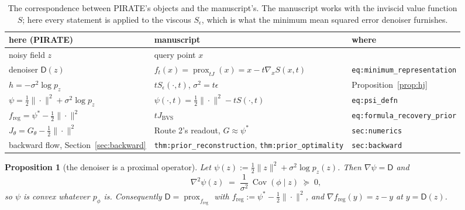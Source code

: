 \documentclass[11pt]{article}
\newtheorem{proposition}{Proposition}
\theoremstyle{definition}
\newcommand{\Cov}{\operatorname{Cov}}
\newcommand{\D}{\mathsf{D}}
\newcommand{\freg}{f_{\mathrm{reg}}}
\newcommand{\prox}{\operatorname{prox}}
\newcommand{\code}[1]{\texttt{#1}}
\newcommand{\Jbvs}{J_{\mathrm{BVS}}}
\begin{document}
\begin{table}[ht]
\centering
\begin{tabular}{lll}
\toprule
here (PIRATE) & manuscript & where \\
\midrule
noisy field $z$ & query point $x$ & \\
denoiser $\D(z)$ & $f_t(x) = \prox_{tJ}(x) = x - t\nabla_x S(x,t)$ & \code{eq:minimum\_representation} \\
$h = -\sigma^2\log p_z$ & $tS_\epsilon(\cdot,t)$, $\sigma^2 = t\epsilon$ & Proposition~\ref{prop:hj} \\
$\psi = \tfrac12\|\cdot\|^2 + \sigma^2\log p_z$ & $\psi(\cdot,t) = \tfrac12\|\cdot\|^2 - tS(\cdot,t)$ & \code{eq:psi\_defn} \\
$\freg = \psi^* - \tfrac12\|\cdot\|^2$ & $t\Jbvs$ & \code{eq:formula\_recovery\_prior} \\
$J_\theta = G_\theta - \tfrac12\|\cdot\|^2$ & Route 2's readout, $G \approx \psi^*$ & \code{sec:numerics} \\
backward flow, Section~\ref{sec:backward} & \code{thm:prior\_reconstruction}, \code{thm:prior\_optimality} & \code{sec:backward} \\
\bottomrule
\end{tabular}
\caption{The correspondence between PIRATE's objects and the manuscript's. The manuscript works with the inviscid value function $S$; here every statement is applied to the viscous $S_\epsilon$, which is what the minimum mean squared error denoiser furnishes.}
\label{tab:dictionary}
\end{table}

\begin{proposition}[the denoiser is a proximal operator]
\label{prop:prox}
Let $\psi(z) := \tfrac12\|z\|^2 + \sigma^2 \log p_z(z)$. Then $\nabla\psi = \D$ and
\begin{equation}
\label{eq:hess}
\nabla^2 \psi(z) \;=\; \frac{1}{\sigma^2}\,\Cov(\phi \mid z) \;\succeq\; 0,
\end{equation}
so $\psi$ is convex \emph{whatever $p_\phi$ is}. Consequently $\D = \prox_{\freg}$ with $\freg := \psi^* - \tfrac12\|\cdot\|^2$, and $\nabla\freg(y) = z - y$ at $y = \D(z)$.
\end{proposition}
\end{document}
